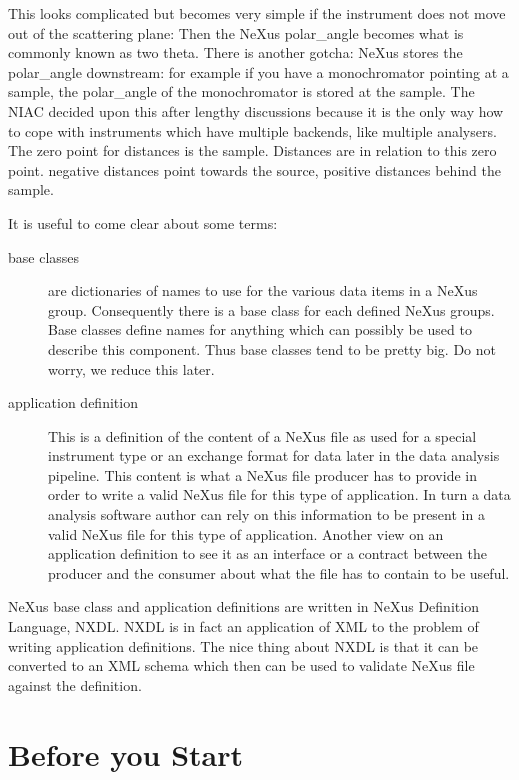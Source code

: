 \documentclass[a4paper]{article}\usepackage[dvips]{graphicx}
\begin{document}
This looks complicated but becomes very simple if the instrument does not move out of the scattering plane: Then the 
NeXus polar\_angle becomes what is commonly known as two theta. There is another gotcha: NeXus stores the polar\_angle 
downstream: for example if you have a monochromator pointing at a sample, the polar\_angle of the monochromator is 
stored at the sample. The NIAC decided upon this after lengthy discussions because it is the only way how to cope with 
instruments which have multiple backends, like multiple analysers.  
The zero point for distances is the sample. Distances are in relation to this zero point. negative distances point 
towards the source, positive distances behind the sample.



It is useful to come clear about some terms:


\begin{description}
\item[base classes]  are dictionaries of names to use for the various data items in a NeXus group. Consequently there is 
 a base class for each defined NeXus groups.  Base classes define names for anything which can possibly be used 
 to describe this component. Thus base classes tend to be pretty big. Do not worry, we reduce this later.
\item[application definition]  This is a definition of the content of a NeXus file as used for a special instrument type or 
 an exchange format for data later in the data analysis pipeline. This content is what a NeXus file producer has to 
 provide in order to write a valid NeXus file for this type of application. In turn a data analysis software author can 
 rely on this information to be present in a valid NeXus file for this type of application. Another view on an application 
 definition to see it as an interface or a contract between the producer and the consumer about what the file has to 
 contain to be useful.   
\end{description}

NeXus base class and application definitions are written in NeXus Definition Language, NXDL. NXDL is in fact an 
application of XML to the problem of writing application definitions. The nice thing about NXDL is that it can be 
converted to an XML schema which then can be used to validate NeXus file against the definition. 




\section{Before you Start }
\end{document}
